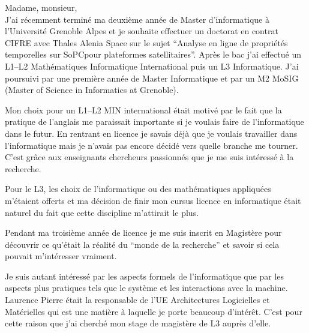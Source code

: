 \documentclass[11pt, a4paper]{awesome-cv} %
\begin{document}
\makecvheader %






\begin{addmargin}{-1cm}
\end{addmargin}

\vspace{1.4cm}

Madame, monsieur,\\

J'ai récemment terminé ma deuxième année de Master d'informatique à
l'Université Grenoble Alpes et je souhaite effectuer un doctorat en
contrat CIFRE avec Thales Alenia Space sur le sujet ``Analyse en ligne
de propriétés temporelles sur SoPCpour plateformes
satellitaires''. Après le bac j'ai effectué un L1--L2 Mathématiques
Informatique International puis un L3 Informatique. J'ai poursuivi par
une première année de Master Informatique et par un M2 MoSIG (Master
of Science in Informatics at Grenoble).

Mon choix pour un L1--L2 MIN international était motivé par le fait
que la pratique de l'anglais me paraissait importante si je voulais
faire de l'informatique dans le futur. En rentrant en licence je
savais déjà que je voulais travailler dans l'informatique mais je
n'avais pas encore décidé vers quelle branche me tourner. C'est
grâce aux enseignants chercheurs passionnés que je me suis intéressé
à la recherche.

Pour le L3, les choix de l'informatique ou des mathématiques
appliquées m'étaient offerts et ma décision de finir mon cursus
licence en informatique était naturel du fait que cette discipline
m'attirait le plus.

Pendant ma troisième année de licence je me suis inscrit en
Magistère pour découvrir ce qu'était la réalité du ``monde de la
recherche'' et savoir si cela pouvait m'intéresser vraiment.

Je suis autant intéressé par les aspects formels de l'informatique
que par les aspects plus pratiques tels que le système et les
interactions avec la machine. Laurence Pierre était la responsable
de l'UE Architectures Logicielles et Matérielles qui est une matière à
laquelle je porte beaucoup d'intérêt. C'est pour cette raison que
j'ai cherché mon stage de magistère de L3 auprès d'elle.
\end{document}
